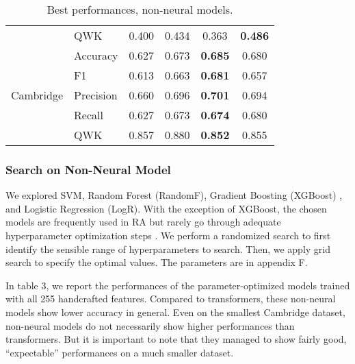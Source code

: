 \documentclass[11pt]{article}
\begin{document}
\begin{table}[h]
{\begin{tabular}{cl|cccc}
                                 &QWK        &0.400          &0.434 &0.363          &\textbf{0.486}     \\\cmidrule(lr){1-6}
    \multirow{5}{*}{Cambridge}   &Accuracy   &0.627          &0.673 &\textbf{0.685} &0.680               \\
                                 &F1         &0.613          &0.663 &\textbf{0.681} &0.657               \\
                                 &Precision  &0.660          &0.696 &\textbf{0.701} &0.694               \\
                                 &Recall     &0.627          &0.673 &\textbf{0.674} &0.680               \\
                                 &QWK        &0.857          &0.880 &\textbf{0.852} &0.855               \\
    \cmidrule(lr){1-6}
    \end{tabular}
    }
\caption{\label{Append} Best performances, non-neural models.}
\end{table}
\subsubsection{Search on Non-Neural Model}

We explored SVM, Random Forest (RandomF), Gradient Boosting (XGBoost) \citep{chen2016xgboost}, and Logistic Regression (LogR). With the exception of XGBoost, the chosen models are frequently used in RA but rarely go through adequate hyperparameter optimization steps \citep{ma2012ranking,yaneva2017combining,mohammadi2020machine}. We perform a randomized search to first identify the sensible range of hyperparameters to search. Then, we apply grid search to specify the optimal values. The parameters are in appendix F.

In table 3, we report the performances of the parameter-optimized models trained with all 255 handcrafted features. Compared to transformers, these non-neural models show lower accuracy in general. Even on the smallest Cambridge dataset, non-neural models do not necessarily show higher performances than transformers. But it is important to note that they managed to show fairly good, ``expectable'' performances on a much smaller dataset.
\end{document}
